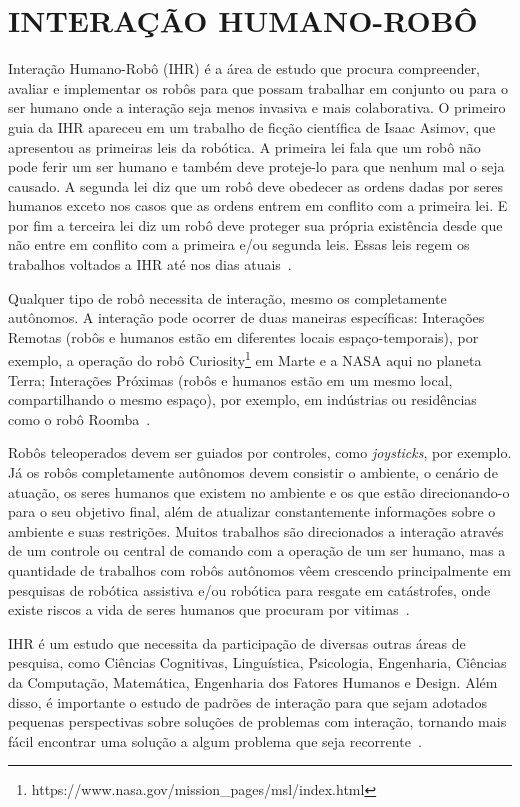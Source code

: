\chapter{INTERAÇÃO HUMANO-ROBÔ}
\label{cap:ihr}
Interação Humano-Robô (IHR) é a área de estudo que procura compreender, avaliar e implementar os robôs para que possam trabalhar em conjunto ou para o ser humano onde a interação seja menos invasiva e mais colaborativa. O primeiro guia da IHR apareceu em um trabalho de ficção científica de Isaac Asimov, que apresentou as primeiras leis da robótica. A primeira lei fala que um robô não pode ferir um ser humano e também deve proteje-lo para que nenhum mal o seja causado. A segunda lei diz que um robô deve obedecer as ordens dadas por seres humanos exceto nos casos que as ordens entrem em conflito com a primeira lei. E por fim a terceira lei diz um robô deve proteger sua própria existência desde que não entre em conflito com a primeira e/ou segunda leis. Essas leis regem os trabalhos voltados a IHR até nos dias atuais~\cite{Goodrich:2007, Weiss:2010}. 

Qualquer tipo de robô necessita de interação, mesmo os completamente autônomos. A interação pode ocorrer de duas maneiras específicas: Interações Remotas (robôs e humanos estão em diferentes locais espaço-temporais), por exemplo, a operação do robô Curiosity\footnote{https://www.nasa.gov/mission\_pages/msl/index.html} em Marte e a NASA aqui no planeta Terra; Interações Próximas (robôs e humanos estão em um mesmo local, compartilhando o mesmo espaço), por exemplo, em indústrias ou residências como o robô Roomba~\cite{Goodrich:2007}. 

Robôs teleoperados devem ser guiados por controles, como \emph{joysticks}, por exemplo. Já os robôs completamente autônomos devem consistir o ambiente, o cenário de atuação, os seres humanos que existem no ambiente e os que estão direcionando-o para o seu objetivo final, além de atualizar constantemente informações sobre o ambiente e suas restrições. Muitos trabalhos são direcionados a interação através de um controle ou central de comando com a operação de um ser humano, mas a quantidade de trabalhos com robôs autônomos vêem crescendo principalmente em pesquisas de robótica assistiva e/ou robótica para resgate em catástrofes, onde existe riscos a vida de seres humanos que procuram por vitimas~\cite{Goodrich:2007, Weiss:2010}.

IHR é um estudo que necessita da participação de diversas outras áreas de pesquisa, como Ciências Cognitivas, Linguística, Psicologia, Engenharia, Ciências da Computação, Matemática, Engenharia dos Fatores Humanos e Design. Além disso, é importante o estudo de padrões de interação para que sejam adotados pequenas perspectivas sobre soluções de problemas com interação, tornando mais fácil encontrar uma solução a algum problema que seja recorrente~\cite{Goodrich:2007}.

